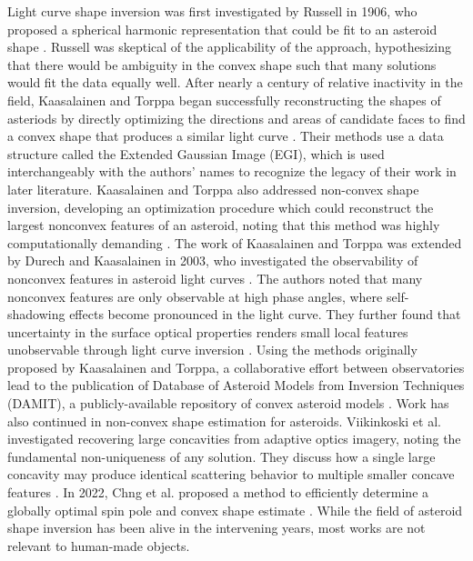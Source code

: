 Light curve shape inversion was first investigated by Russell in 1906, who proposed a spherical harmonic representation that could be fit to an asteroid shape \cite{russell1906}. Russell was skeptical of the applicability of the approach, hypothesizing that there would be ambiguity in the convex shape such that many solutions would fit the data equally well. After nearly a century of relative inactivity in the field, Kaasalainen and Torppa began successfully reconstructing the shapes of asteriods by directly optimizing the directions and areas of candidate faces to find a convex shape that produces a similar light curve \cite{kaasalainen2000, kaasalainen2001}. Their methods use a data structure called the Extended Gaussian Image (EGI), which is used interchangeably with the authors' names to recognize the legacy of their work in later literature. Kaasalainen and Torppa also addressed non-convex shape inversion, developing an optimization procedure which could reconstruct the largest nonconvex features of an asteroid, noting that this method was highly computationally demanding \cite{kaasalainen2000}. The work of Kaasalainen and Torppa was extended by Durech and Kaasalainen in 2003, who investigated the observability of nonconvex features in asteroid light curves \cite{durech2003}. The authors noted that many nonconvex features are only observable at high phase angles, where self-shadowing effects become pronounced in the light curve. They further found that uncertainty in the surface optical properties renders small local features unobservable through light curve inversion \cite{durech2003}. Using the methods originally proposed by Kaasalainen and Torppa, a collaborative effort between observatories lead to the publication of Database of Asteroid Models from Inversion Techniques (DAMIT), a publicly-available repository of convex asteroid models \cite{damit2014}. Work has also continued in non-convex shape estimation for asteroids. Viikinkoski et al. \cite{viikinkoski2017} investigated recovering large concavities from adaptive optics imagery, noting the fundamental non-uniqueness of any solution. They discuss how a single large concavity may produce identical scattering behavior to multiple smaller concave features \cite{viikinkoski2017}. In 2022, Chng et al. proposed a method to efficiently determine a globally optimal spin pole and convex shape estimate \cite{chng2022}. While the field of asteroid shape inversion has been alive in the intervening years, most works are not relevant to human-made objects.

